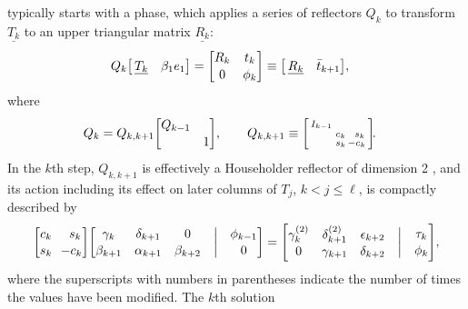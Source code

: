 \documentclass{doc_acmtrans2m}
\begin{document}
\MINRESQLP typically starts with a \MINRES phase, which applies a
series of reflectors $Q_k$ to transform $\underline{T_k}$ to an upper
triangular matrix $\underline{R_k}$:
\begin{align}
       Q_k \bmat{\,\underline{T_k} & \beta_1 e_1} &= \bmat{R_k & t_k
         \\ 0 & \phi_k} \equiv\bmat{\,\underline{R_k} &
         \bar{t}_{k+1}}, \label{right_ortho}
\end{align}
where
\begin{align*}
      Q_k &= Q_{k,k+1} \bmat{Q_{k-1} \\ & 1},   \qquad
      Q_{k,k+1}  \equiv
       \left[\begin{smallmatrix}
           I_{k-1}&&
        \\        & c_k &   \!\!\phantom-s_k
        \\        & s_k &   \!-c_k
        \end{smallmatrix}\right]\!\!.      \nonumber \end{align*}
In the $k$th step, $Q_{k,k+1}$ is effectively a Householder reflector
of dimension 2 \cite[Exercise 10.4]{TB}, and its action including its
effect on later columns of $T_j$, $k < j \le \ell$, is compactly
described by
\begin{equation*}  \label{min7}
  \bmat{   c_k & \!\!\!\phantom-s_k
        \\ s_k & \!\! -c_k}
  \bmat{\begin{matrix}
           \gamma_k & \delta_{k+1} & 0
        \\ \beta_{k+1}    & \alpha_{k+1}       & \beta_{k+2}
        \end{matrix}
        & \biggm| &
        \begin{matrix} \phi_{k-1} \\ 0 \end{matrix}
       }
=
  \bmat{\begin{matrix}
           \gamma_k^{(2)} & \delta_{k+1}^{(2)} & \epsilon_{k+2}
        \\ 0              & \gamma_{k+1} & \delta_{k+2}
        \end{matrix}
        & \biggm| &
        \begin{matrix} \tau_k \\ \phi_k \end{matrix}
       },
\end{equation*}
where the superscripts with numbers in parentheses indicate the number
of times the values have been modified.  The $k$th solution
\end{document}
